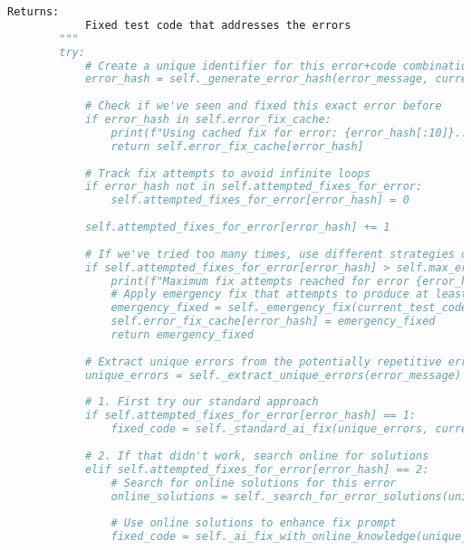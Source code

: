 \begin{lstlisting}[language=Python, caption={$\texttt{Test\_Generator}$ class.}, label={lst:14}]
        Returns:
            Fixed test code that addresses the errors
        """
        try:
            # Create a unique identifier for this error+code combination to track fix attempts
            error_hash = self._generate_error_hash(error_message, current_test_code)
            
            # Check if we've seen and fixed this exact error before
            if error_hash in self.error_fix_cache:
                print(f"Using cached fix for error: {error_hash[:10]}...")
                return self.error_fix_cache[error_hash]
            
            # Track fix attempts to avoid infinite loops
            if error_hash not in self.attempted_fixes_for_error:
                self.attempted_fixes_for_error[error_hash] = 0
            
            self.attempted_fixes_for_error[error_hash] += 1
            
            # If we've tried too many times, use different strategies or bail out
            if self.attempted_fixes_for_error[error_hash] > self.max_error_fix_attempts:
                print(f"Maximum fix attempts reached for error {error_hash[:10]}. Applying emergency fix...")
                # Apply emergency fix that attempts to produce at least a basic test case
                emergency_fixed = self._emergency_fix(current_test_code, error_message)
                self.error_fix_cache[error_hash] = emergency_fixed
                return emergency_fixed
            
            # Extract unique errors from the potentially repetitive error message
            unique_errors = self._extract_unique_errors(error_message)
            
            # 1. First try our standard approach
            if self.attempted_fixes_for_error[error_hash] == 1:
                fixed_code = self._standard_ai_fix(unique_errors, current_test_code)
                
            # 2. If that didn't work, search online for solutions
            elif self.attempted_fixes_for_error[error_hash] == 2:
                # Search for online solutions for this error
                online_solutions = self._search_for_error_solutions(unique_errors)
                
                # Use online solutions to enhance fix prompt
                fixed_code = self._ai_fix_with_online_knowledge(unique_errors, current_test_code, online_solutions)
                

\end{lstlisting}
